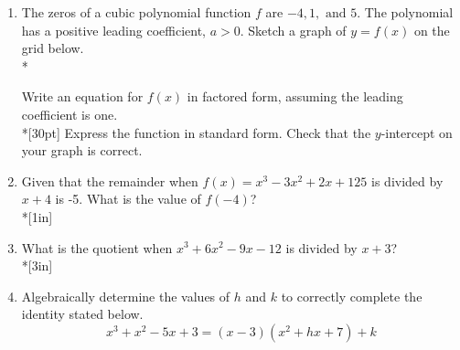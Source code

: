 \documentclass[12pt, oneside]{article}
\begin{document}
\begin{enumerate}
\newpage
\item The zeros of a cubic polynomial function $f$ are  $-4, 1, \text{ and } 5$. The polynomial has a positive leading coefficient, $a>0$. Sketch a graph of $y = f(x)$ on the grid below.\\*
\begin{center}
\end{center}
Write an equation for $f(x)$ in factored form, assuming the leading coefficient is one.\\*[30pt]
Express the function in standard form. Check that the $y$-intercept on your graph is correct.

\newpage


\item Given that the remainder when  $f(x)=x^3-3x^2+2x+125$ is divided by $x+4$ is -5. What is the value of $f(-4)$? \\*[1in]

\item What is the quotient when $x^3+6x^2-9x-12$ is divided by $x + 3$?\\*[3in]

\item Algebraically determine the values of $h$ and $k$ to correctly complete the identity stated below.
\[x^3+x^2-5x+3=(x-3)(x^2+hx+7)+k\] %


\end{enumerate}
\end{document}

